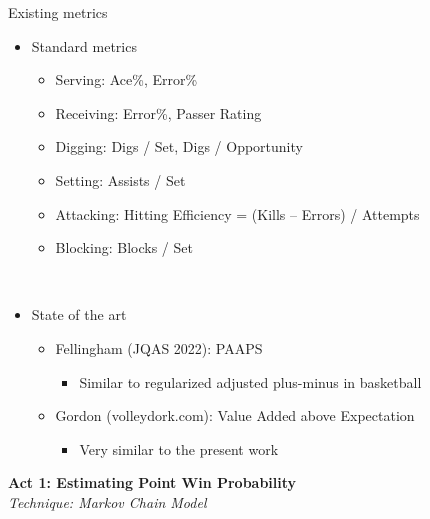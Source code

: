 \documentclass[handout]{beamer}
\begin{document}
\begin{frame}{Existing metrics}
  \begin{itemize}
    \item Standard metrics
    \begin{itemize}
      \item Serving: Ace\%, Error\%
      \item Receiving: Error\%, Passer Rating
      \item Digging: Digs / Set, Digs / Opportunity
      \item Setting: Assists / Set
      \item Attacking: Hitting Efficiency = (Kills -- Errors) / Attempts
      \item Blocking: Blocks / Set
    \end{itemize}
    ~\\
    \item State of the art
    \begin{itemize}
      \item Fellingham (JQAS 2022): PAAPS
      \begin{itemize}
        \item Similar to regularized adjusted plus-minus in basketball
      \end{itemize}
      \item Gordon (volleydork.com): Value Added above Expectation
      \begin{itemize}
        \item Very similar to the present work
      \end{itemize}
    \end{itemize}
  \end{itemize}
\end{frame}

\begin{frame}
  \centering
  {\color{riceblue} \bf Act 1: Estimating Point Win Probability}\\
  {\color{ricegray} \it Technique: Markov Chain Model}
\end{frame}
\end{document}
